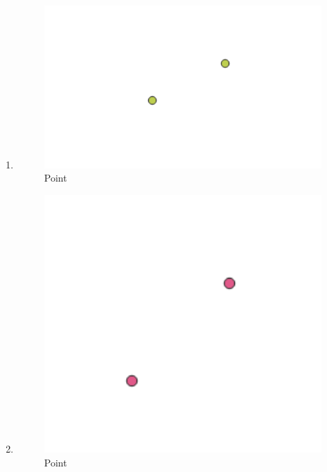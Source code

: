 \begin{enumerate}
	\item 
	
	\begin{figure}[H]
		\includegraphics[width=12cm]{figures/1174050/3.PNG}
		\centering
		\caption{Point}
	\end{figure}
	
	\item 
	
	\begin{figure}[H]
		\includegraphics[width=12cm]{figures/1174050/4.PNG}
		\centering
		\caption{Point}
	\end{figure}
	

\end{enumerate}
